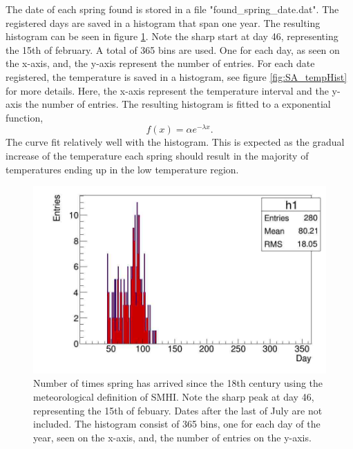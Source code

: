 \documentclass[a4paper,12pt]{article}
\begin{document}
The date of each spring found is stored in a file 
"found\_spring\_date.dat". The registered days are saved in a histogram 
that span one year. The resulting histogram can be seen in figure 
\ref{fig:SA_dayHist}. Note the sharp start at day 46, representing the 
15th of february. A total of 365 bins are used. One for each day, as 
seen on the x-axis, and, the y-axis represent the number of entries.
For each date registered, the temperature is saved in a histogram, see 
figure \ref{fig:SA_tempHist} for more details. Here, the x-axis 
represent the temperature interval and the y-axis the number of 
entries. The resulting histogram is fitted to a exponential function,
\begin{equation}
	f(x)=\alpha e^{-\lambda x}.\label{eq:SA_fitfunc}
\end{equation}
The curve fit relatively well with the histogram. This is expected as 
the gradual increase of the temperature each spring should result in 
the majority of temperatures ending up in the low temperature region.
\begin{figure}[htb]
	\centering
	\includegraphics[scale=.4]{../Code/springArrive_dayHist.jpg}
	\caption{Number of times spring has arrived since the 18th century 
	using the meteorological definition of SMHI. Note the sharp peak at 
	day 46, representing the 15th of febuary. Dates after the last of July 
	are not included. The histogram consist of 365 bins, one for each day 
	of the year, seen on the x-axis, and, the number of entries on the 
	y-axis.}
	\label{fig:SA_dayHist}
\end{figure}
\end{document}

